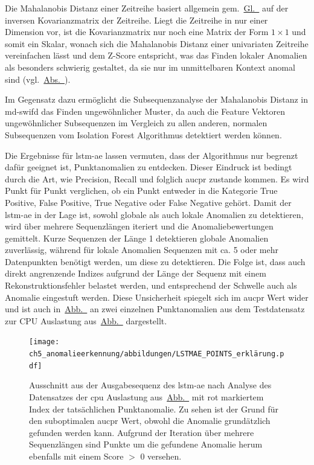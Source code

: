 Die Mahalanobis Distanz einer Zeitreihe basiert allgemein gem.~\hyperref[eq:mahalanobis_dist]{Gl.~} auf der inversen Kovarianzmatrix der
Zeitreihe. Liegt die Zeitreihe in nur einer Dimension vor, ist die Kovarianzmatrix nur noch eine Matrix der Form $1\times 1$ und somit ein Skalar, wonach sich die
Mahalanobis Distanz einer univariaten Zeitreihe vereinfachen lässt und dem Z-Score entspricht, was das Finden lokaler Anomalien als besonders schwierig gestaltet,
da sie nur im unmittelbaren Kontext anomal sind (vgl.~\hyperref[sec:punktanomalien]{Abs.~}).

Im Gegensatz dazu ermöglicht die Subsequenzanalyse der Mahalanobis Distanz in \ac{md-swifd} das Finden ungewöhnlicher Muster, da auch die Feature Vektoren ungewöhnlicher
Subsequenzen im Vergleich zu allen anderen, normalen Subsequenzen vom Isolation Forest Algorithmus detektiert werden können.

Die Ergebnisse für \ac{lstm-ae} lassen vermuten, dass der Algorithmus nur begrenzt dafür geeignet ist, Punktanomalien zu entdecken. Dieser Eindruck ist bedingt
durch die Art, wie Precision, Recall und folglich \ac{aucpr} zustande kommen. Es wird Punkt für Punkt verglichen, ob ein Punkt entweder in die Kategorie True Positive,
False Positive, True Negative oder False Negative gehört. Damit der \ac{lstm-ae} in der Lage ist, sowohl globale als auch lokale Anomalien zu detektieren,
wird über mehrere Sequenzlängen iteriert und die Anomaliebewertungen gemittelt. Kurze Sequenzen der Länge 1 detektieren globale Anomalien zuverlässig, während für
lokale Anomalien Sequenzen mit ca. 5 oder mehr Datenpunkten benötigt werden, um diese zu detektieren. Die Folge ist, dass auch direkt angrenzende Indizes aufgrund der
Länge der Sequenz mit einem Rekonstruktionsfehler belastet werden, und entsprechend der Schwelle auch als Anomalie eingestuft werden. Diese Unsicherheit spiegelt sich
im \ac{aucpr} Wert wider und ist auch in~\hyperref[fig:lstmae_points_mse]{Abb.~} an zwei einzelnen Punktanomalien aus dem Testdatensatz zur
CPU Auslastung aus~\hyperref[fig:punktanomalien_testdata]{Abb.~} dargestellt.

\begin{figure}[H]
    \centering
        \texttt{[image: ch5\_anomalieerkennung/abbildungen/LSTMAE\_POINTS\_erklärung.pdf]}
    \caption{\centering Ausschnitt aus der Ausgabesequenz des \acs*{lstm-ae} nach Analyse des Datensatzes der \acs*{cpu} Auslastung
    aus~\hyperref[fig:punktanomalien_testdata]{Abb.~} mit rot markiertem Index der tatsächlichen Punktanomalie. Zu sehen ist der
    Grund für den suboptimalen \acs*{aucpr} Wert, obwohl die Anomalie grundätzlich gefunden werden kann. Aufgrund der Iteration über mehrere Sequenzlängen sind Punkte
    um die gefundene Anomalie herum ebenfalls mit einem Score $>$ 0 versehen.}
    \label{fig:lstmae_points_mse}
\end{figure}

